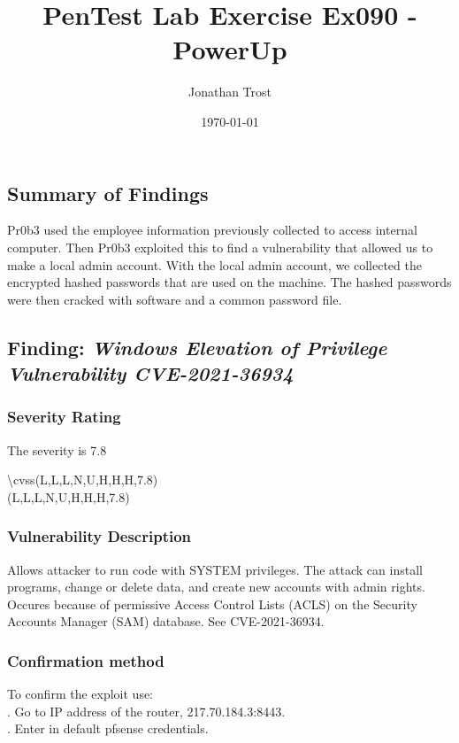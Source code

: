 \documentclass[notitlepage]{article}
\begin{document}
	
	
	\title{PenTest Lab Exercise Ex090 - PowerUp}
	\author{Jonathan Trost}
	\date{\isodate\today}
	
	\maketitle
	
	\tableofcontents
	
	\newpage
	
	\subsection{Summary of Findings}
	\indent Pr0b3 used the employee information previously collected to access internal computer. Then Pr0b3 exploited this to find a vulnerability that allowed us to make a local admin account. With the local admin account, we collected the encrypted hashed passwords that are used on the machine. The hashed passwords were then cracked with software and a common password file. 
	
	\subsection{Finding: \emph{Windows Elevation of Privilege Vulnerability CVE-2021-36934}}
	
	\subsubsection{Severity Rating}
	\indent The severity is 7.8 

	\textbackslash cvss(L,L,L,N,U,H,H,H,7.8)\\
	\cvss(L,L,L,N,U,H,H,H,7.8) \\
	
	\subsubsection{Vulnerability Description}
	\indent Allows attacker to run code with SYSTEM privileges.  The attack can install programs, change or delete data, and create new accounts with admin rights. Occures because of permissive Access Control Lists (ACLS) on the Security Accounts Manager (SAM) database. See CVE-2021-36934.\\
	
	\subsubsection{Confirmation method}
	To confirm the exploit use: \\
	. Go to IP address of the router, 217.70.184.3:8443.\\
	. Enter in default pfsense credentials.\\
	
\end{document}
